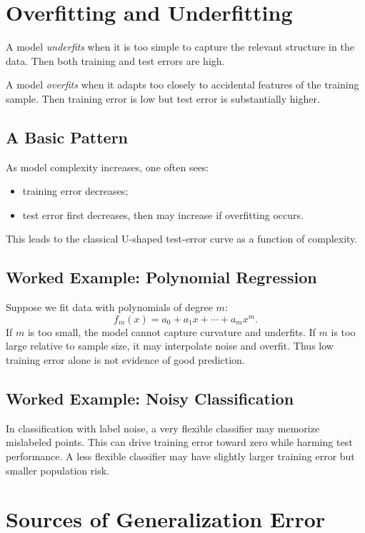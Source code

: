 \section{Overfitting and Underfitting}

A model \emph{underfits} when it is too simple to capture the relevant structure in the data. Then both training and test errors are high.

A model \emph{overfits} when it adapts too closely to accidental features of the training sample. Then training error is low but test error is substantially higher.

\subsection{A Basic Pattern}

As model complexity increases, one often sees:
\begin{itemize}
    \item training error decreases;
    \item test error first decreases, then may increase if overfitting occurs.
\end{itemize}

This leads to the classical U-shaped test-error curve as a function of complexity.

\subsection{Worked Example: Polynomial Regression}

Suppose we fit data with polynomials of degree $m$:
\[
f_m(x)=a_0+a_1x+\cdots+a_m x^m.
\]
If $m$ is too small, the model cannot capture curvature and underfits. If $m$ is too large relative to sample size, it may interpolate noise and overfit. Thus low training error alone is not evidence of good prediction.

\subsection{Worked Example: Noisy Classification}

In classification with label noise, a very flexible classifier may memorize mislabeled points. This can drive training error toward zero while harming test performance. A less flexible classifier may have slightly larger training error but smaller population risk.

\section{Sources of Generalization Error}

